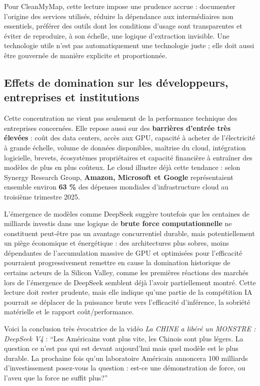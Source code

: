 \documentclass[
  10pt,
  a4paper,
  DIV=11,
  numbers=noendperiod,
  oneside]{scrreprt}
\let\oldtextbf\textbf
\renewcommand{\textbf}[1]{\oldtextbf{\textcolor{cmmnavy}{#1}}}
\let\oldemph\emph
\renewcommand{\emph}[1]{\oldemph{\textcolor{cmmgray}{#1}}}
\begin{document}
Pour CleanMyMap, cette lecture impose une prudence accrue : documenter
l'origine des services utilisés, réduire la dépendance aux
intermédiaires non essentiels, préférer des outils dont les conditions
d'usage sont transparentes et éviter de reproduire, à son échelle, une
logique d'extraction invisible. Une technologie utile n'est pas
automatiquement une technologie juste ; elle doit aussi être gouvernée
de manière explicite et proportionnée.

\subsection{Effets de domination sur les développeurs, entreprises et
institutions}\label{effets-de-domination-sur-les-duxe9veloppeurs-entreprises-et-institutions}

Cette concentration ne vient pas seulement de la performance technique
des entreprises concernées. Elle repose aussi sur des \textbf{barrières
d'entrée très élevées} : coût des data centers, accès aux GPU, capacité
à acheter de l'électricité à grande échelle, volume de données
disponibles, maîtrise du cloud, intégration logicielle, brevets,
écosystèmes propriétaires et capacité financière à entraîner des modèles
de plus en plus coûteux. Le cloud illustre déjà cette tendance : selon
Synergy Research Group, \textbf{Amazon, Microsoft et Google}
représentaient ensemble environ \textbf{63 \%} des dépenses mondiales
d'infrastructure cloud au troisième trimestre 2025.

L'émergence de modèles comme DeepSeek suggère toutefois que les
centaines de milliards investis dans une logique de \textbf{brute force
computationnelle} ne constituent peut-être pas un avantage concurrentiel
durable, mais potentiellement un piège économique et énergétique : des
architectures plus sobres, moins dépendantes de l'accumulation massive
de GPU et optimisées pour l'efficacité pourraient progressivement
remettre en cause la domination historique de certains acteurs de la
Silicon Valley, comme les premières réactions des marchés lors de
l'émergence de DeepSeek semblent déjà l'avoir partiellement montré.
Cette lecture doit rester prudente, mais elle indique qu'une partie de
la compétition IA pourrait se déplacer de la puissance brute vers
l'efficacité d'inférence, la sobriété matérielle et le rapport
coût/performance.

Voici la conclusion très évocatrice de la vidéo \emph{La CHINE a libéré
un MONSTRE : DeepSeek V4} : ``Les Américains vont plus vite, les Chinois
sont plus légers. La question ce n'est pas qui est devant aujourd'hui
mais quel modèle est le plus durable. La prochaine fois qu'un
laboratoire Américain annoncera 100 milliards d'investissement
posez-vous la question : est-ce une démonstration de force, ou l'aveu
que la force ne suffit plus?''
\end{document}
